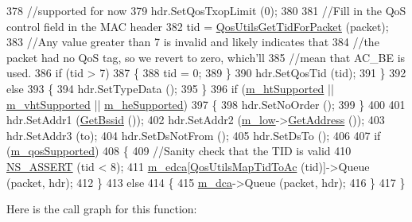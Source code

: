 \begin{DoxyCode}
378       \textcolor{comment}{//supported for now}
379       hdr.SetQosTxopLimit (0);
380 
381       \textcolor{comment}{//Fill in the QoS control field in the MAC header}
382       tid = \hyperlink{group__wifi_gaa7ad20082f78b63633d0557d24927150}{QosUtilsGetTidForPacket} (packet);
383       \textcolor{comment}{//Any value greater than 7 is invalid and likely indicates that}
384       \textcolor{comment}{//the packet had no QoS tag, so we revert to zero, which'll}
385       \textcolor{comment}{//mean that AC\_BE is used.}
386       \textcolor{keywordflow}{if} (tid > 7)
387         \{
388           tid = 0;
389         \}
390       hdr.SetQosTid (tid);
391     \}
392   \textcolor{keywordflow}{else}
393     \{
394       hdr.SetTypeData ();
395     \}
396   \textcolor{keywordflow}{if} (\hyperlink{classns3_1_1RegularWifiMac_a8950c44b8cf2ad1f9274821cf88adc7b}{m\_htSupported} || \hyperlink{classns3_1_1RegularWifiMac_a151f330fdeb3f83f9ec7cf07537f0e86}{m\_vhtSupported} || 
      \hyperlink{classns3_1_1RegularWifiMac_a9458143c722fa0b6e5d223d41585842a}{m\_heSupported})
397     \{
398       hdr.SetNoOrder ();
399     \}
400 
401   hdr.SetAddr1 (\hyperlink{classns3_1_1RegularWifiMac_acd1705832e3f4a235c2ca6a84b5a577b}{GetBssid} ());
402   hdr.SetAddr2 (\hyperlink{classns3_1_1RegularWifiMac_a726ce0ade9bb7e6b7d81cd397f32dbde}{m\_low}->\hyperlink{classns3_1_1MacLow_a109922d4f2bb1ee0b2a66aa3bcc48e2f}{GetAddress} ());
403   hdr.SetAddr3 (to);
404   hdr.SetDsNotFrom ();
405   hdr.SetDsTo ();
406 
407   \textcolor{keywordflow}{if} (\hyperlink{classns3_1_1RegularWifiMac_aeecdb918687493a8efdd70304bc0cee9}{m\_qosSupported})
408     \{
409       \textcolor{comment}{//Sanity check that the TID is valid}
410       \hyperlink{assert_8h_a6dccdb0de9b252f60088ce281c49d052}{NS\_ASSERT} (tid < 8);
411       \hyperlink{classns3_1_1RegularWifiMac_ac750365ab3708902cc0b7700164c706d}{m\_edca}[\hyperlink{group__wifi_ga4e36efcff6dd83eaee42e1af0de43d48}{QosUtilsMapTidToAc} (tid)]->Queue (packet, hdr);
412     \}
413   \textcolor{keywordflow}{else}
414     \{
415       \hyperlink{classns3_1_1RegularWifiMac_a152965c3def1a308b088b37c2c88a1a2}{m\_dca}->Queue (packet, hdr);
416     \}
417 \}
\end{DoxyCode}


Here is the call graph for this function\+:


